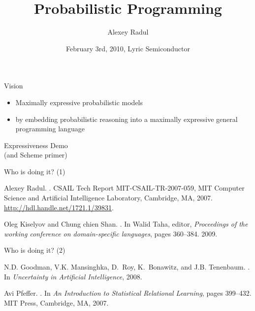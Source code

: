 \documentclass{beamer}
\title[Probabilistic Programming]{Probabilistic Programming}
\author{Alexey Radul}
\date{February 3rd, 2010, Lyric Semiconductor}
\newcommand{\wordslide}[1]{\begin{frame}\begin{center}\Huge {#1}\end{center}\end{frame}}
\begin{document}
\begin{frame}
\maketitle
\end{frame}

\begin{frame}
\begin{center}\Huge Vision\end{center}
\begin{itemize}
\item Maximally expressive probabilistic models
\pause
\item by embedding probabilistic reasoning into a maximally expressive general
programming language
\end{itemize}
\end{frame}

\wordslide{Expressiveness Demo\\ \small (and Scheme primer)}

\begin{frame}
\begin{center}\Huge Who is doing it? (1)\end{center}
\begin{thebibliography}{1}
Alexey Radul.
.
\newblock CSAIL Tech Report MIT-CSAIL-TR-2007-059, MIT Computer Science and
  Artificial Intelligence Laboratory, Cambridge, MA, 2007.
  \url{http://hdl.handle.net/1721.1/39831}.

Oleg Kiselyov and Chung chien Shan.
.
\newblock In Walid Taha, editor, {\em Proceedings of the working conference on
  domain-specific languages}, pages 360--384. 2009.

\end{thebibliography}
\end{frame}

\begin{frame}
\begin{center}\Huge Who is doing it? (2)\end{center}
\begin{thebibliography}{1}
N.D. Goodman, V.K. Mansinghka, D.~Roy, K.~Bonawitz, and J.B. Tenenbaum.
.
\newblock In {\em Uncertainty in Artificial Intelligence}, 2008.

Avi Pfeffer.
.
\newblock In {\em An Introduction to Statistical Relational Learning}, pages
  399--432. MIT Press, Cambridge, MA, 2007.

\end{thebibliography}
\end{frame}
\end{document}
